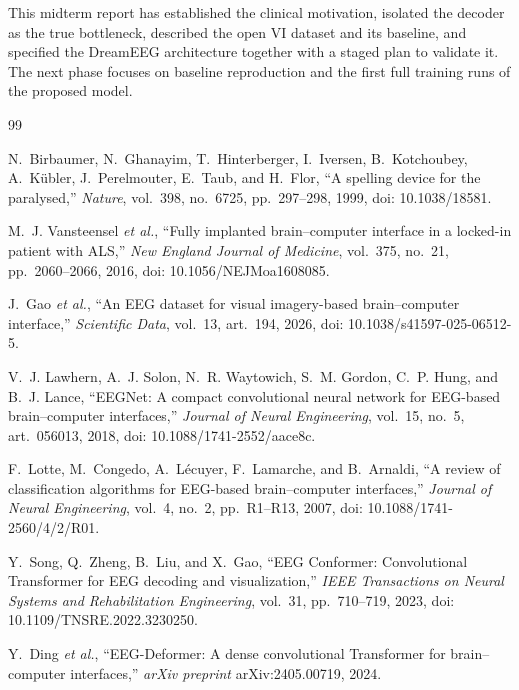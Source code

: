 \documentclass[conference]{IEEEtran}
\begin{document}
This midterm report has established the clinical motivation, isolated the
decoder as the true bottleneck, described the open VI dataset and its
baseline, and specified the DreamEEG architecture together with a staged plan
to validate it. The next phase focuses on baseline reproduction and the first
full training runs of the proposed model.

\begin{thebibliography}{99}

N.~Birbaumer, N.~Ghanayim, T.~Hinterberger, I.~Iversen, B.~Kotchoubey,
A.~K\"ubler, J.~Perelmouter, E.~Taub, and H.~Flor, ``A spelling device for
the paralysed,'' \textit{Nature}, vol.~398, no.~6725, pp.~297--298, 1999,
doi: 10.1038/18581.

M.~J. Vansteensel \textit{et al.}, ``Fully implanted brain--computer
interface in a locked-in patient with ALS,'' \textit{New England Journal of
Medicine}, vol.~375, no.~21, pp.~2060--2066, 2016,
doi: 10.1056/NEJMoa1608085.

J.~Gao \textit{et al.}, ``An EEG dataset for visual imagery-based
brain--computer interface,'' \textit{Scientific Data}, vol.~13, art.~194,
2026, doi: 10.1038/s41597-025-06512-5.

V.~J. Lawhern, A.~J. Solon, N.~R. Waytowich, S.~M. Gordon, C.~P. Hung, and
B.~J. Lance, ``EEGNet: A compact convolutional neural network for EEG-based
brain--computer interfaces,'' \textit{Journal of Neural Engineering},
vol.~15, no.~5, art.~056013, 2018, doi: 10.1088/1741-2552/aace8c.

F.~Lotte, M.~Congedo, A.~L\'ecuyer, F.~Lamarche, and B.~Arnaldi, ``A review
of classification algorithms for EEG-based brain--computer interfaces,''
\textit{Journal of Neural Engineering}, vol.~4, no.~2, pp.~R1--R13, 2007,
doi: 10.1088/1741-2560/4/2/R01.

Y.~Song, Q.~Zheng, B.~Liu, and X.~Gao, ``EEG Conformer: Convolutional
Transformer for EEG decoding and visualization,'' \textit{IEEE Transactions
on Neural Systems and Rehabilitation Engineering}, vol.~31, pp.~710--719,
2023, doi: 10.1109/TNSRE.2022.3230250.

Y.~Ding \textit{et al.}, ``EEG-Deformer: A dense convolutional Transformer
for brain--computer interfaces,'' \textit{arXiv preprint}
arXiv:2405.00719, 2024.


\end{thebibliography}
\end{document}
